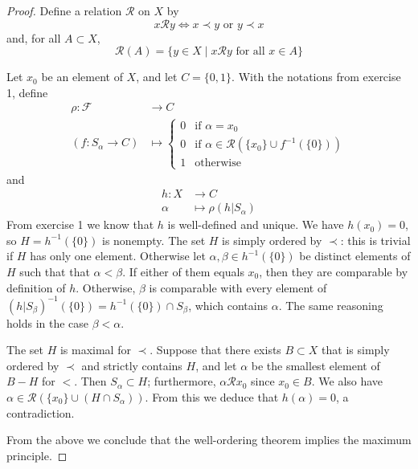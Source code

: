 \documentclass[11pt,a4paper,twoside]{article}
\theoremstyle{definition}
\theoremstyle{plain}
\begin{document}
\begin{proof}
Define a relation $\mathscr{R}$ on $X$ by
\begin{equation*}
    x \mathscr{R} y \iff x \prec y \text{ or } y \prec x
\end{equation*}
and, for all $A \subset X$,
\begin{equation*}
    \mathscr{R} (A) = \{ y \in X \mid x \mathscr{R} y \text{ for all } x \in A \}
\end{equation*}

Let $x_0$ be an element of $X$, and let $C = \{ 0, 1 \}$. With the notations
from exercise 1, define
\begin{align*}
    \rho \colon \mathscr{F} &\to C \\
    (f \colon S_\alpha \to C) &\mapsto \begin{cases}
        0 & \text{if } \alpha = x_0 \\
        0 & \text{if } \alpha \in \mathscr{R} \left( \{ x_0 \} \cup f^{-1} \left( \{ 0 \} \right) \right) \\
        1 & \text{otherwise}
    \end{cases}
\end{align*}
and
\begin{align*}
    h \colon X &\to C \\
    \alpha &\mapsto \rho ( h | S_{\alpha} )
\end{align*}
From exercise 1 we know that $h$ is well-defined and unique. We have $h ( x_0 ) = 0$,
so $H = h^{-1} ( \{ 0 \} )$ is nonempty. The set $H$ is simply ordered by $\prec$: this
is trivial if $H$ has only one element. Otherwise let $\alpha, \beta \in h^{-1} ( \{ 0 \} )$
be distinct elements of $H$ such that that $\alpha < \beta$. If either of them equals $x_0$,
then they are comparable by definition of $h$. Otherwise, $\beta$ is comparable with every
element of $( h | S_\beta )^{-1} ( \{ 0 \} ) = h^{-1} ( \{ 0 \} ) \cap S_\beta$, which contains
$\alpha$. The same reasoning holds in the case $\beta < \alpha$.

The set $H$ is maximal for $\prec$. Suppose that there exists $B \subset X$ that is simply
ordered by $\prec$ and strictly contains $H$, and let $\alpha$ be the smallest
element of $B - H$ for $<$. Then $S_\alpha \subset H$; furthermore, $\alpha \mathscr{R} x_0$
since $x_0 \in B$. We also have $\alpha \in \mathscr{R} \left( \{ x_0 \} \cup \left( H \cap S_\alpha \right) \right)$.
From this we deduce that $h ( \alpha ) = 0$, a contradiction.

From the above we conclude that the well-ordering theorem implies the maximum principle.

\end{proof}
\end{document}
